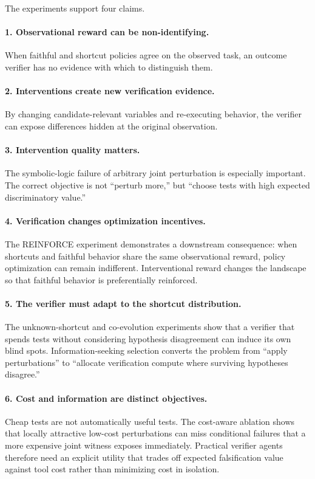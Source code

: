 \documentclass[10pt]{article}
\begin{document}
The experiments support four claims.

\paragraph{1. Observational reward can be non-identifying.}
When faithful and shortcut policies agree on the observed task, an outcome verifier has no evidence with which to distinguish them.

\paragraph{2. Interventions create new verification evidence.}
By changing candidate-relevant variables and re-executing behavior, the verifier can expose differences hidden at the original observation.

\paragraph{3. Intervention quality matters.}
The symbolic-logic failure of arbitrary joint perturbation is especially important. The correct objective is not ``perturb more,'' but ``choose tests with high expected discriminatory value.''

\paragraph{4. Verification changes optimization incentives.}
The REINFORCE experiment demonstrates a downstream consequence: when shortcuts and faithful behavior share the same observational reward, policy optimization can remain indifferent. Interventional reward changes the landscape so that faithful behavior is preferentially reinforced.


\paragraph{5. The verifier must adapt to the shortcut distribution.}
The unknown-shortcut and co-evolution experiments show that a verifier that spends tests without considering hypothesis disagreement can induce its own blind spots. Information-seeking selection converts the problem from ``apply perturbations'' to ``allocate verification compute where surviving hypotheses disagree.''

\paragraph{6. Cost and information are distinct objectives.}
Cheap tests are not automatically useful tests. The cost-aware ablation shows that locally attractive low-cost perturbations can miss conditional failures that a more expensive joint witness exposes immediately. Practical verifier agents therefore need an explicit utility that trades off expected falsification value against tool cost rather than minimizing cost in isolation.
\end{document}
